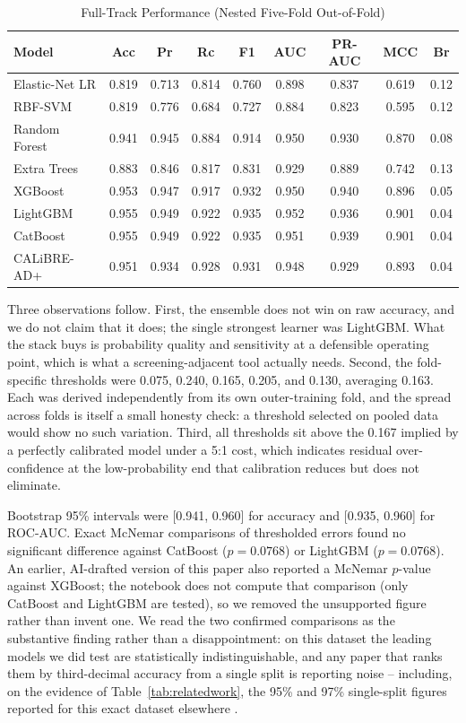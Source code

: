 \documentclass[conference]{IEEEtran}
\begin{document}
\begin{table}[!t]
\caption{Full-Track Performance (Nested Five-Fold Out-of-Fold)}
\label{tab:full}
\centering
\begin{tabular}{@{}lcccccccc@{}}
\toprule
\textbf{Model} & \textbf{Acc} & \textbf{Pr} & \textbf{Rc} & \textbf{F1} & \textbf{AUC} & \textbf{PR-AUC} & \textbf{MCC} & \textbf{Br} \\
\midrule
Elastic-Net LR & 0.819 & 0.713 & 0.814 & 0.760 & 0.898 & 0.837 & 0.619 & 0.12 \\
RBF-SVM & 0.819 & 0.776 & 0.684 & 0.727 & 0.884 & 0.823 & 0.595 & 0.12 \\
Random Forest & 0.941 & 0.945 & 0.884 & 0.914 & 0.950 & 0.930 & 0.870 & 0.08 \\
Extra Trees & 0.883 & 0.846 & 0.817 & 0.831 & 0.929 & 0.889 & 0.742 & 0.13 \\
XGBoost & 0.953 & 0.947 & 0.917 & 0.932 & 0.950 & 0.940 & 0.896 & 0.05 \\
LightGBM & 0.955 & 0.949 & 0.922 & 0.935 & 0.952 & 0.936 & 0.901 & 0.04 \\
CatBoost & 0.955 & 0.949 & 0.922 & 0.935 & 0.951 & 0.939 & 0.901 & 0.04 \\
CALiBRE-AD+ & 0.951 & 0.934 & 0.928 & 0.931 & 0.948 & 0.929 & 0.893 & 0.04 \\
\bottomrule
\end{tabular}
\end{table}

Three observations follow. First, the ensemble does not win on raw accuracy, and we do not claim that it does; the single strongest learner was LightGBM. What the stack buys is probability quality and sensitivity at a defensible operating point, which is what a screening-adjacent tool actually needs. Second, the fold-specific thresholds were 0.075, 0.240, 0.165, 0.205, and 0.130, averaging 0.163. Each was derived independently from its own outer-training fold, and the spread across folds is itself a small honesty check: a threshold selected on pooled data would show no such variation. Third, all thresholds sit above the 0.167 implied by a perfectly calibrated model under a 5:1 cost, which indicates residual over-confidence at the low-probability end that calibration reduces but does not eliminate.

Bootstrap 95\% intervals were [0.941, 0.960] for accuracy and [0.935, 0.960] for ROC-AUC. Exact McNemar comparisons of thresholded errors found no significant difference against CatBoost ($p=0.0768$) or LightGBM ($p=0.0768$). An earlier, AI-drafted version of this paper also reported a McNemar $p$-value against XGBoost; the notebook does not compute that comparison (only CatBoost and LightGBM are tested), so we removed the unsupported figure rather than invent one. We read the two confirmed comparisons as the substantive finding rather than a disappointment: on this dataset the leading models we did test are statistically indistinguishable, and any paper that ranks them by third-decimal accuracy from a single split is reporting noise -- including, on the evidence of Table~\ref{tab:relatedwork}, the 95\% and 97\% single-split figures reported for this exact dataset elsewhere \cite{b13,b37}.
\end{document}
